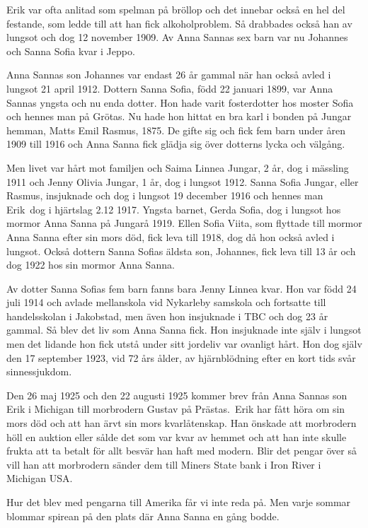 Erik var ofta anlitad som spelman på bröllop och det innebar också en hel del festande, som ledde till att han fick alkoholproblem. Så drabbades också han av lungsot och dog 12 november 1909. Av Anna Sannas sex barn var nu Johannes och Sanna Sofia kvar i Jeppo.

Anna Sannas son Johannes var endast 26 år gammal när han också avled i lungsot 21 april 1912. Dottern Sanna Sofia, född 22 januari 1899, var Anna Sannas yngsta och nu enda dotter. Hon hade varit fosterdotter hos moster Sofia och hennes man på Grötas. Nu hade hon hittat en bra karl i bonden på Jungar hemman, Matts Emil Rasmus,  1875.
De gifte sig och fick fem barn under åren 1909 till 1916 och Anna Sanna fick glädja sig över dotterns lycka och välgång.

Men livet var hårt mot familjen och Saima Linnea Jungar, 2 år, dog i mässling 1911 och Jenny Olivia Jungar, 1 år, dog i lungsot 1912. Sanna Sofia Jungar, eller Rasmus, insjuknade och dog i lungsot 19 december 1916 och hennes man Erik dog i hjärtslag 2.12 1917. Yngsta barnet, Gerda Sofia, dog i lungsot hos mormor Anna Sanna på Jungarå 1919. Ellen Sofia Viita, som flyttade till mormor Anna Sanna efter sin mors död, fick leva till 1918, dog då hon också avled i lungsot. Också dottern Sanna Sofias äldsta son, Johannes, fick leva till 13 år och dog 1922 hos sin mormor Anna Sanna.

Av dotter Sanna Sofias fem barn fanns bara Jenny Linnea kvar. Hon var född 24 juli 1914 och avlade mellanskola vid Nykarleby samskola och fortsatte till handelsskolan i Jakobstad, men även hon insjuknade i TBC och dog 23 år gammal.
Så blev det liv som Anna Sanna fick. Hon insjuknade inte själv i lungsot men det lidande hon fick utstå under sitt jordeliv var ovanligt hårt. Hon dog själv den 17 september 1923, vid 72 års ålder, av hjärnblödning efter en kort tids svår sinnessjukdom.

Den 26 maj 1925 och den 22 augusti 1925 kommer brev från Anna Sannas son Erik i Michigan till morbrodern Gustav på Prästas. Erik har fått höra om sin mors död och att han ärvt sin mors kvarlåtenskap. Han önskade att morbrodern höll en auktion eller sålde det som var kvar av hemmet och att han inte skulle frukta att ta betalt för allt besvär han haft med modern. Blir det pengar över så vill han att morbrodern sänder dem till Miners State bank i Iron River i Michigan USA.

Hur det blev med pengarna till Amerika får vi inte reda på. Men varje sommar blommar spirean på den plats där Anna Sanna en gång bodde.



